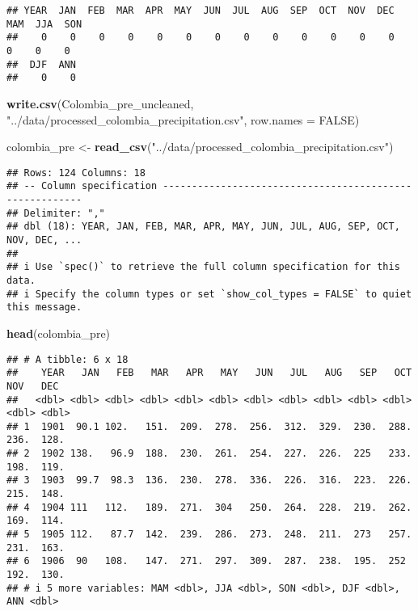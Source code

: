 \documentclass[
]{article}
\newenvironment{Shaded}{\begin{snugshade}}{\end{snugshade}}
\newcommand{\AttributeTok}[1]{\textcolor[rgb]{0.13,0.29,0.53}{#1}}
\newcommand{\ConstantTok}[1]{\textcolor[rgb]{0.56,0.35,0.01}{#1}}
\newcommand{\FunctionTok}[1]{\textcolor[rgb]{0.13,0.29,0.53}{\textbf{#1}}}
\newcommand{\NormalTok}[1]{#1}
\newcommand{\OtherTok}[1]{\textcolor[rgb]{0.56,0.35,0.01}{#1}}
\newcommand{\StringTok}[1]{\textcolor[rgb]{0.31,0.60,0.02}{#1}}
\begin{document}
\begin{verbatim}
## YEAR  JAN  FEB  MAR  APR  MAY  JUN  JUL  AUG  SEP  OCT  NOV  DEC  MAM  JJA  SON 
##    0    0    0    0    0    0    0    0    0    0    0    0    0    0    0    0 
##  DJF  ANN 
##    0    0
\end{verbatim}

\begin{Shaded}
\begin{Highlighting}[]
\FunctionTok{write.csv}\NormalTok{(Colombia\_pre\_uncleaned, }\StringTok{"../data/processed\_colombia\_precipitation.csv"}\NormalTok{,}
    \AttributeTok{row.names =} \ConstantTok{FALSE}\NormalTok{)}

\NormalTok{colombia\_pre }\OtherTok{\textless{}{-}} \FunctionTok{read\_csv}\NormalTok{(}\StringTok{"../data/processed\_colombia\_precipitation.csv"}\NormalTok{)}
\end{Highlighting}
\end{Shaded}

\begin{verbatim}
## Rows: 124 Columns: 18
## -- Column specification --------------------------------------------------------
## Delimiter: ","
## dbl (18): YEAR, JAN, FEB, MAR, APR, MAY, JUN, JUL, AUG, SEP, OCT, NOV, DEC, ...
## 
## i Use `spec()` to retrieve the full column specification for this data.
## i Specify the column types or set `show_col_types = FALSE` to quiet this message.
\end{verbatim}

\begin{Shaded}
\begin{Highlighting}[]
\FunctionTok{head}\NormalTok{(colombia\_pre)}
\end{Highlighting}
\end{Shaded}

\begin{verbatim}
## # A tibble: 6 x 18
##    YEAR   JAN   FEB   MAR   APR   MAY   JUN   JUL   AUG   SEP   OCT   NOV   DEC
##   <dbl> <dbl> <dbl> <dbl> <dbl> <dbl> <dbl> <dbl> <dbl> <dbl> <dbl> <dbl> <dbl>
## 1  1901  90.1 102.   151.  209.  278.  256.  312.  329.  230.  288.  236.  128.
## 2  1902 138.   96.9  188.  230.  261.  254.  227.  226.  225   233.  198.  119.
## 3  1903  99.7  98.3  136.  230.  278.  336.  226.  316.  223.  226.  215.  148.
## 4  1904 111   112.   189.  271.  304   250.  264.  228.  219.  262.  169.  114.
## 5  1905 112.   87.7  142.  239.  286.  273.  248.  211.  273   257.  231.  163.
## 6  1906  90   108.   147.  271.  297.  309.  287.  238.  195.  252   192.  130.
## # i 5 more variables: MAM <dbl>, JJA <dbl>, SON <dbl>, DJF <dbl>, ANN <dbl>
\end{verbatim}
\end{document}
